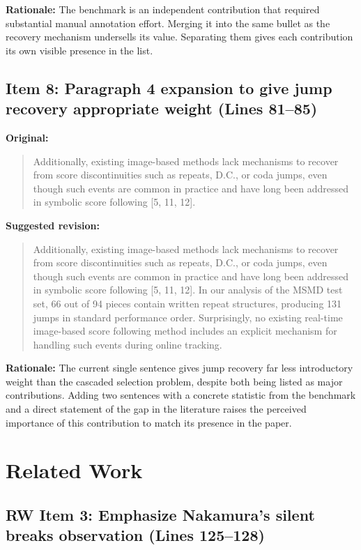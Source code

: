 \documentclass{article}
\begin{document}
\textbf{Rationale:}
The benchmark is an independent contribution that required substantial manual annotation effort. Merging it into the same bullet as the recovery mechanism undersells its value. Separating them gives each contribution its own visible presence in the list.

\subsection*{Item 8: Paragraph 4 expansion to give jump recovery appropriate weight (Lines 81--85)}

\textbf{Original:}
\begin{quote}
Additionally, existing image-based methods lack mechanisms to recover from score discontinuities such as repeats, D.C., or coda jumps, even though such events are common in practice and have long been addressed in symbolic score following [5, 11, 12].
\end{quote}

\textbf{Suggested revision:}
\begin{quote}
Additionally, existing image-based methods lack mechanisms to recover from score discontinuities such as repeats, D.C., or coda jumps, even though such events are common in practice and have long been addressed in symbolic score following [5, 11, 12]. In our analysis of the MSMD test set, 66 out of 94 pieces contain written repeat structures, producing 131 jumps in standard performance order. Surprisingly, no existing real-time image-based score following method includes an explicit mechanism for handling such events during online tracking.
\end{quote}

\textbf{Rationale:}
The current single sentence gives jump recovery far less introductory weight than the cascaded selection problem, despite both being listed as major contributions. Adding two sentences with a concrete statistic from the benchmark and a direct statement of the gap in the literature raises the perceived importance of this contribution to match its presence in the paper.


\section*{Related Work}

\subsection*{RW Item 3: Emphasize Nakamura's silent breaks observation (Lines 125--128)}
\end{document}
